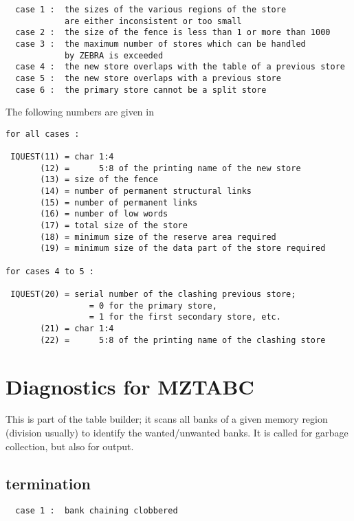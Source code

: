 \begin{verbatim}
  case 1 :  the sizes of the various regions of the store
            are either inconsistent or too small
  case 2 :  the size of the fence is less than 1 or more than 1000
  case 3 :  the maximum number of stores which can be handled
            by ZEBRA is exceeded
  case 4 :  the new store overlaps with the table of a previous store
  case 5 :  the new store overlaps with a previous store
  case 6 :  the primary store cannot be a split store
\end{verbatim}

The following numbers are given in 

\begin{verbatim}
for all cases :

 IQUEST(11) = char 1:4
       (12) =      5:8 of the printing name of the new store
       (13) = size of the fence
       (14) = number of permanent structural links
       (15) = number of permanent links
       (16) = number of low words
       (17) = total size of the store
       (18) = minimum size of the reserve area required
       (19) = minimum size of the data part of the store required

for cases 4 to 5 :

 IQUEST(20) = serial number of the clashing previous store;
                 = 0 for the primary store,
                 = 1 for the first secondary store, etc.
       (21) = char 1:4
       (22) =      5:8 of the printing name of the clashing store
\end{verbatim}

\section{Diagnostics for MZTABC}

This is part of the table builder;
it scans all banks of a given memory region (division usually)
to identify the wanted/unwanted banks.
It is called for garbage collection, but also for output.

\subsection*{ termination}

\begin{verbatim}
  case 1 :  bank chaining clobbered
\end{verbatim}

